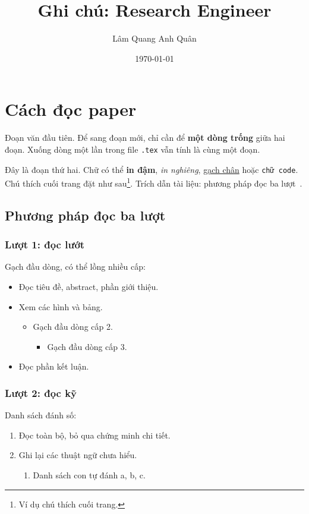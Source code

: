 \documentclass[11pt,a4paper]{article}
\title{\sffamily\bfseries Ghi chú: Research Engineer}
\author{Lâm Quang Anh Quân}
\date{\today}
\begin{document}
\maketitle
\tableofcontents

\section{Cách đọc paper}

Đoạn văn đầu tiên. Để sang đoạn mới, chỉ cần để \textbf{một dòng trống}
giữa hai đoạn. Xuống dòng một lần trong file \texttt{.tex} vẫn tính là cùng một đoạn.

Đây là đoạn thứ hai. Chữ có thể \textbf{in đậm}, \emph{in nghiêng},
\underline{gạch chân} hoặc \texttt{chữ code}. Chú thích cuối trang đặt như sau\footnote{Ví dụ chú thích cuối trang.}.
Trích dẫn tài liệu: phương pháp đọc ba lượt~\citep{keshav2007read}.

\subsection{Phương pháp đọc ba lượt}

\subsubsection{Lượt 1: đọc lướt}

Gạch đầu dòng, có thể lồng nhiều cấp:
\begin{itemize}
  \item Đọc tiêu đề, abstract, phần giới thiệu.
  \item Xem các hình và bảng.
  \begin{itemize}
    \item Gạch đầu dòng cấp 2.
    \begin{itemize}
      \item Gạch đầu dòng cấp 3.
    \end{itemize}
  \end{itemize}
  \item Đọc phần kết luận.
\end{itemize}

\subsubsection{Lượt 2: đọc kỹ}

Danh sách đánh số:
\begin{enumerate}
  \item Đọc toàn bộ, bỏ qua chứng minh chi tiết.
  \item Ghi lại các thuật ngữ chưa hiểu.
  \begin{enumerate}
    \item Danh sách con tự đánh a, b, c.
  \end{enumerate}
\end{enumerate}
\end{document}
